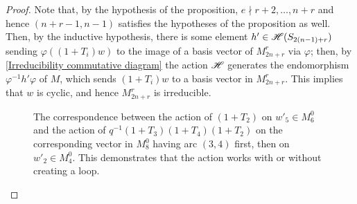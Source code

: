 \documentclass{amsart}
\begin{document}
\begin{proof}
  Note that, by the hypothesis of the proposition, $e \nmid r+2,\dots,n+r$ and hence $(n+r-1,n-1)$ satisfies the hypotheses of the proposition as well.
  Then, by the inductive hypothesis, there is some element $h' \in \mathscr{H}(S_{2(n-1) + r})$ sending $\varphi((1 + T_i)w)$ to the image of a basis vector of $M_{2n + r}^r$ via $\varphi$;
  then, by \eqref{Irreducibility commutative diagram} the action $\mathscr{H}$ generates the endomorphism $\varphi^{-1}h'\varphi$ of $M$, which sends $(1 + T_i)w$ to a basis vector in $M_{2n + r}^r$.
  This implies that $w$ is cyclic, and hence $M_{2n + r}^r$ is irreducible.
  \begin{figure}
  \begin{adjustbox}{width=\textwidth}
     \hspace{20pt} 
  \end{adjustbox}
  \begin{adjustbox}{width=\textwidth}
     \hspace{20pt}
\end{adjustbox}
  \caption{The correspondence between the action of $(1 + T_2)$ on $w'_5 \in M^0_6$ and the action of $q^{-1}(1 + T_3)(1 + T_4)(1 + T_2)$ on the corresponding vector in $M^0_8$ having arc $(3,4)$ first, then on $w'_2 \in M^0_4$.
  This demonstrates that the action works with or without creating a loop.
  }
  \label{bigloop}
  \end{figure}
\end{proof}
\end{document}
